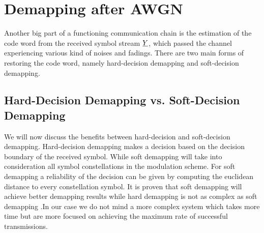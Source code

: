 \section{Demapping after AWGN}
Another big part of a functioning communication chain is the estimation of the code word from the received symbol stream $\boldmath\underline{Y}$, which passed the channel experiencing various kind of noises and fadings. There are two main forms of restoring the code word, namely hard-decision demapping and soft-decision demapping.
\subsection{Hard-Decision Demapping vs. Soft-Decision Demapping}
We will now discuss the benefits between hard-decision and soft-decision demapping. Hard-decision demapping makes a decision based on the decision boundary of the received symbol. While soft demapping will take into consideration all symbol constellations in the modulation scheme. For soft demapping a reliability of the decision can be given by computing the euclidean distance to every constellation symbol.
It is proven that soft demapping will achieve better demapping results while hard demapping is not as complex as soft demapping \cite{GaussianWaves}.In our case we do not mind a more complex system which takes more time but are more focused on achieving the maximum rate of successful transmissions.
\newpage
